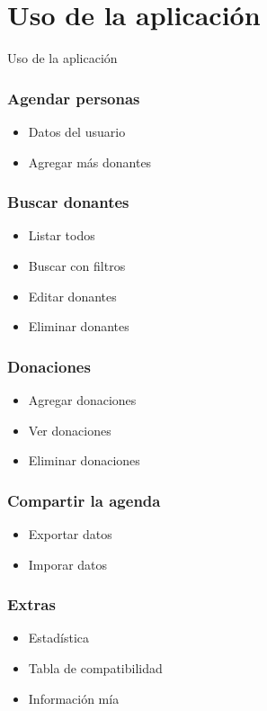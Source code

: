 \documentclass{beamer}
\begin{document}
	\section{Uso de la aplicaci\'on}
		\begin{frame}
			\Huge Uso de la aplicaci\'on
		\end{frame}
		\begin{frame}
			\frametitle{Agendar personas}
			\begin{itemize}
				\item Datos del usuario
				\item Agregar m\'as donantes
			\end{itemize}
		\end{frame}
		\begin{frame}
			\frametitle{Buscar donantes}
			\begin{itemize}
				\item Listar todos
				\item Buscar con filtros
				\item Editar donantes
				\item Eliminar donantes
			\end{itemize}
		\end{frame}
		\begin{frame}
			\frametitle{Donaciones}
			\begin{itemize}
				\item Agregar donaciones
				\item Ver donaciones
				\item Eliminar donaciones
			\end{itemize}
		\end{frame}
		\begin{frame}
			\frametitle{Compartir la agenda}
			\begin{itemize}
				\item Exportar datos
				\item Imporar datos
			\end{itemize}
		\end{frame}
		\begin{frame}
			\frametitle{Extras}
			\begin{itemize}
				\item Estad\'istica
				\item Tabla de compatibilidad
				\item Informaci\'on m\'ia
			\end{itemize}
		\end{frame}
\end{document}
